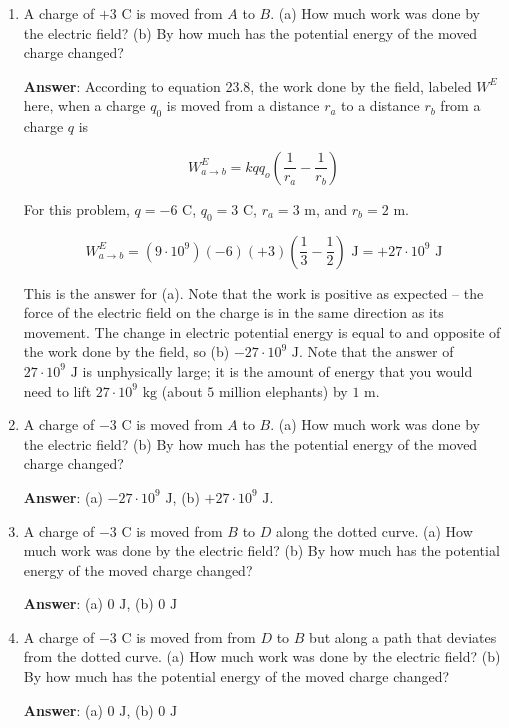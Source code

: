 \documentclass{article}
\begin{document}
\begin{enumerate}

  \item A charge of $+3\text{ C}$ is moved from $A$ to $B$. (a) How much work was done by the electric field? (b) By how much has the potential energy of the moved charge changed?

        \ifsolutions
        {\bf Answer}: According to equation 23.8, the work done by the field, labeled $W^E$ here, when a charge $q_0$ is moved from a distance $r_a$ to a distance $r_b$ from a charge $q$ is

        $$
        W^E_{a\rightarrow b} = kqq_o\left(\frac{1}{r_a}-\frac{1}{r_b}\right)
        $$

        For this problem, $q=-6\text{ C}$, $q_0=3\text{ C}$, $r_a=3\text{ m}$, and $r_b=2\text{ m}$.

        $$
        W^E_{a\rightarrow b} = (9\cdot 10^9)(-6)(+3)\left(\frac{1}{3}-\frac{1}{2}\right)\text{ J} = +27\cdot 10^9\text{ J}
        $$

        This is the answer for (a). Note that the work is positive as expected -- the force of the electric field on the charge is in the same direction as its movement. The change in electric potential energy is equal to and opposite of the work done by the field, so (b) $-27\cdot 10^9\text{ J}$. Note that the answer of $27\cdot 10^9\text{ J}$ is unphysically large; it is the amount of energy that you would need to lift $27\cdot 10^9\text{ kg}$ (about $5$ million elephants) by $1\text{ m}$. 
        \else

        \vskip 48pt
        \fi

  \item A charge of $-3\text{ C}$ is moved from $A$ to $B$. (a) How much work was done by the electric field? (b) By how much has the potential energy of the moved charge changed?

        \ifsolutions
        {\bf Answer}: (a) $-27\cdot 10^9\text{ J}$, (b) $+27\cdot 10^9\text{ J}$. 
        \else

        \vskip 48pt
        \fi

  \item A charge of $-3\text{ C}$ is moved from $B$ to $D$ along the dotted curve. (a) How much work was done by the electric field? (b) By how much has the potential energy of the moved charge changed?

        \ifsolutions
        {\bf Answer}: (a) $0\text{ J}$, (b) $0\text{ J}$
        \else

        \vskip 48pt
        \fi

  \item A charge of $-3\text{ C}$ is moved from from $D$ to $B$ but along a path that deviates from the dotted curve. (a) How much work was done by the electric field? (b) By how much has the potential energy of the moved charge changed?

        \ifsolutions
        {\bf Answer}: (a) $0\text{ J}$, (b) $0\text{ J}$
        \fi

\end{enumerate}
\end{document}
